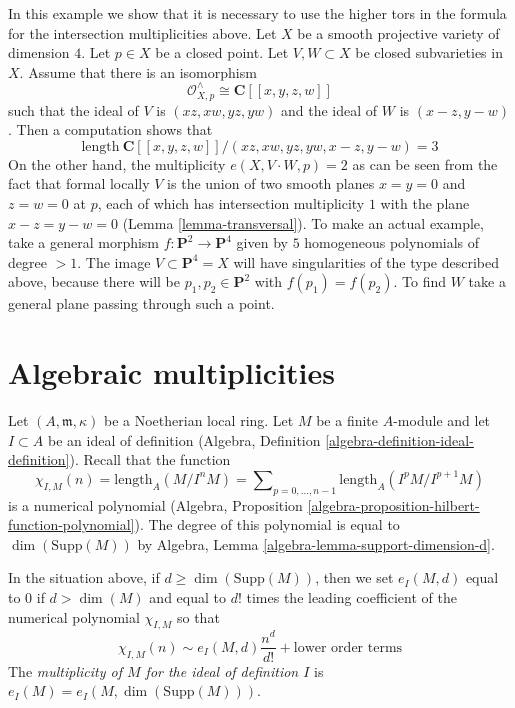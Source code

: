 \begin{example}
\label{example-naive-multiplicity-wrong}
In this example we show that it is necessary to use the higher
tors in the formula for the intersection multiplicities above.
Let $X$ be a smooth projective variety of dimension $4$.
Let $p \in X$ be a closed point. Let $V, W \subset X$
be closed subvarieties in $X$. Assume that there is an
isomorphism
$$
\mathcal{O}_{X, p}^\wedge \cong \mathbf{C}[[x, y, z, w]]
$$
such that the ideal of $V$ is $(xz, xw, yz, yw)$ and the ideal
of $W$ is $(x - z, y - w)$. Then a computation shows that
$$
\text{length}\ \mathbf{C}[[x, y, z, w]]/
(xz, xw, yz, yw, x - z, y - w) = 3
$$
On the other hand, the multiplicity $e(X, V \cdot W, p) = 2$
as can be seen from the fact that formal locally $V$ is the
union of two smooth planes $x = y = 0$ and $z = w = 0$ at $p$,
each of which has intersection multiplicity $1$ with the plane
$x - z = y - w = 0$ (Lemma \ref{lemma-transversal}). To make an
actual example, take
a general morphism $f : \mathbf{P}^2 \to \mathbf{P}^4$ given by
$5$ homogeneous polynomials of degree $> 1$. The image
$V \subset \mathbf{P}^4 = X$ will have singularities of the type
described above, because there will be $p_1, p_2 \in \mathbf{P}^2$
with $f(p_1) = f(p_2)$. To find $W$ take a general plane passing
through such a point.
\end{example}






\section{Algebraic multiplicities}
\label{section-multiplicities}

\noindent
Let $(A, \mathfrak m, \kappa)$ be a Noetherian local ring.
Let $M$ be a finite $A$-module and let $I \subset A$ be an ideal
of definition (Algebra, Definition \ref{algebra-definition-ideal-definition}).
Recall that the function
$$
\chi_{I, M}(n) = \text{length}_A(M/I^nM) =
\sum\nolimits_{p = 0, \ldots, n - 1} \text{length}_A(I^pM/I^{p + 1}M)
$$
is a numerical polynomial
(Algebra, Proposition \ref{algebra-proposition-hilbert-function-polynomial}).
The degree of this polynomial is equal to $\dim(\text{Supp}(M))$ by
Algebra, Lemma \ref{algebra-lemma-support-dimension-d}.

\begin{definition}
\label{definition-multiplicity}
In the situation above, if $d \geq \dim(\text{Supp}(M))$, then we set
$e_I(M, d)$ equal to $0$ if $d > \dim(M)$ and equal to $d!$ times the
leading coefficient of the numerical polynomial $\chi_{I, M}$ so that
$$
\chi_{I, M}(n) \sim e_I(M, d) \frac{n^d}{d!} + \text{lower order terms}
$$
The {\it multiplicity of $M$ for the ideal of definition $I$}
is $e_I(M) = e_I(M, \dim(\text{Supp}(M)))$.
\end{definition}

